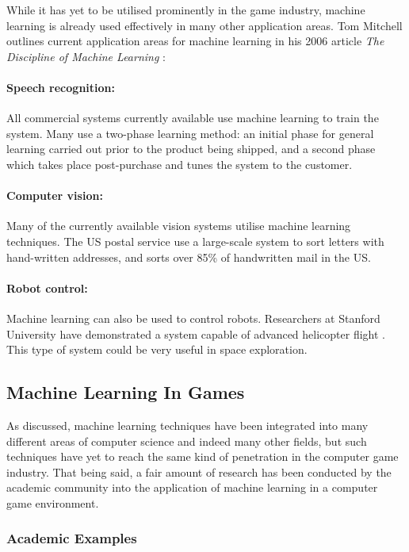 \documentclass[a4paper,oneside]{report}
\begin{document}
While it has yet to be utilised prominently in the game industry, machine learning is already used effectively in many other application areas. Tom Mitchell outlines current application areas for machine learning in his 2006 article \emph{The Discipline of Machine Learning} \cite{Mitchell:2006fv}:

\paragraph{Speech recognition:} All commercial systems currently available use machine learning to train the system. Many use a two-phase learning method: an initial phase for general learning carried out prior to the product being shipped, and a second phase which takes place post-purchase and tunes the system to the customer.

\paragraph{Computer vision:} Many of the currently available vision systems utilise machine learning techniques. The US postal service use a large-scale system to sort letters with hand-written addresses, and sorts over 85\% of handwritten mail in the US.

\paragraph{Robot control:} Machine learning can also be used to control robots. Researchers at Stanford University have demonstrated a system capable of advanced helicopter flight \cite{Ng:2004dz, Abbeel07anapplication, Abbeel:fu}. This type of system could be very useful in space exploration.

\subsection{Machine Learning In Games}

As discussed, machine learning techniques have been integrated into many different areas of computer science and indeed many other fields, but such techniques have yet to reach the same kind of penetration in the computer game industry. That being said, a fair amount of research has been conducted by the academic community into the application of machine learning in a computer game environment. 

\subsubsection{Academic Examples}
\end{document}
